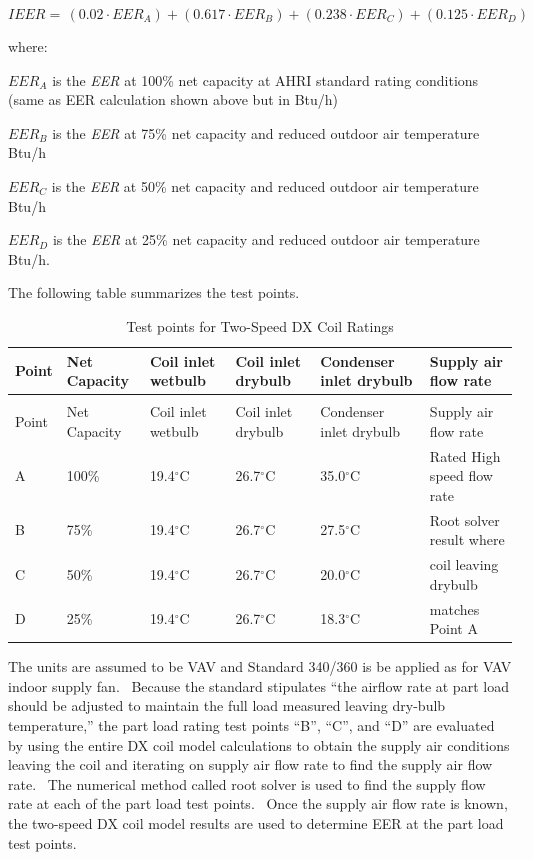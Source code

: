 \begin{equation}
  IEER = \,(0.02 \cdot EE{R_A}) + (0.617 \cdot EE{R_B}) + (0.238 \cdot EE{R_C}) + (0.125 \cdot EE{R_D})
\end{equation}

where:

\(EER_A\) is the \emph{EER} at 100\% net capacity at AHRI standard rating conditions (same as EER calculation shown above but in Btu/h)

\(EER_B\) is the \emph{EER} at 75\% net capacity and reduced outdoor air temperature Btu/h

\(EER_C\) is the \emph{EER} at 50\% net capacity and reduced outdoor air temperature Btu/h

\(EER_D\) is the \emph{EER} at 25\% net capacity and reduced outdoor air temperature Btu/h.

The following table summarizes the test points.

\begin{longtable}[c]{p{0.8in}p{0.8in}p{0.8in}p{0.8in}p{0.8in}p{2.0in}}
\caption{Test points for Two-Speed DX Coil Ratings \label{table:test-points-for-two-speed-dx-coil-ratings}} \tabularnewline
\toprule 
Point & Net Capacity & Coil inlet wetbulb & Coil inlet drybulb & Condenser inlet drybulb & Supply air flow rate \tabularnewline
\midrule
\endfirsthead

\caption[]{Test points for Two-Speed DX Coil Ratings} \tabularnewline
\toprule 
Point & Net Capacity & Coil inlet wetbulb & Coil inlet drybulb & Condenser inlet drybulb & Supply air flow rate \tabularnewline
\midrule
\endhead

A & 100\% & 19.4\(^{\circ}\)C & 26.7\(^{\circ}\)C & 35.0\(^{\circ}\)C & Rated High speed flow rate \tabularnewline
\midrule
B & 75\% & 19.4\(^{\circ}\)C & 26.7\(^{\circ}\)C & 27.5\(^{\circ}\)C & Root solver result where \tabularnewline
C & 50\% & 19.4\(^{\circ}\)C & 26.7\(^{\circ}\)C & 20.0\(^{\circ}\)C & coil leaving drybulb\tabularnewline
D & 25\% & 19.4\(^{\circ}\)C & 26.7\(^{\circ}\)C & 18.3\(^{\circ}\)C & matches Point A\tabularnewline
\bottomrule
\end{longtable}

The units are assumed to be VAV and Standard 340/360 is be applied as for VAV indoor supply fan.~ Because the standard stipulates ``the airflow rate at part load should be adjusted to maintain the full load measured leaving dry-bulb temperature,'' the part load rating test points ``B'', ``C'', and ``D'' are evaluated by using the entire DX coil model calculations to obtain the supply air conditions leaving the coil and iterating on supply air flow rate to find the supply air flow rate.~ The numerical method called root solver is used to find the supply flow rate at each of the part load test points.~ Once the supply air flow rate is known, the two-speed DX coil model results are used to determine EER at the part load test points.

